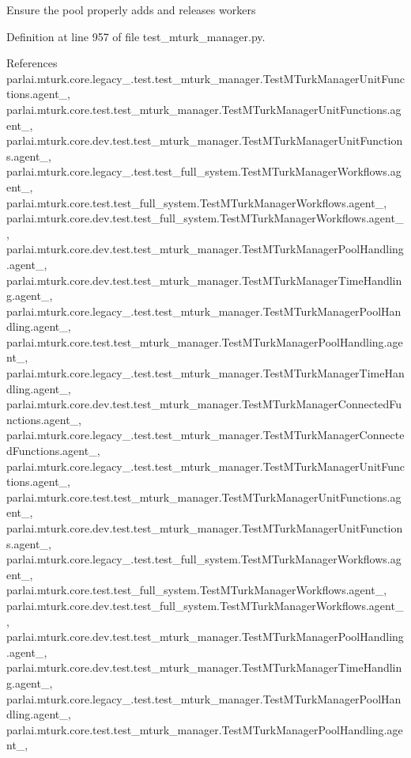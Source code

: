 \begin{DoxyVerb}Ensure the pool properly adds and releases workers\end{DoxyVerb}
 

Definition at line 957 of file test\+\_\+mturk\+\_\+manager.\+py.



References parlai.\+mturk.\+core.\+legacy\+\_.\+test.\+test\+\_\+mturk\+\_\+manager.\+Test\+M\+Turk\+Manager\+Unit\+Functions.\+agent\+\_, parlai.\+mturk.\+core.\+test.\+test\+\_\+mturk\+\_\+manager.\+Test\+M\+Turk\+Manager\+Unit\+Functions.\+agent\+\_, parlai.\+mturk.\+core.\+dev.\+test.\+test\+\_\+mturk\+\_\+manager.\+Test\+M\+Turk\+Manager\+Unit\+Functions.\+agent\+\_, parlai.\+mturk.\+core.\+legacy\+\_.\+test.\+test\+\_\+full\+\_\+system.\+Test\+M\+Turk\+Manager\+Workflows.\+agent\+\_, parlai.\+mturk.\+core.\+test.\+test\+\_\+full\+\_\+system.\+Test\+M\+Turk\+Manager\+Workflows.\+agent\+\_, parlai.\+mturk.\+core.\+dev.\+test.\+test\+\_\+full\+\_\+system.\+Test\+M\+Turk\+Manager\+Workflows.\+agent\+\_, parlai.\+mturk.\+core.\+dev.\+test.\+test\+\_\+mturk\+\_\+manager.\+Test\+M\+Turk\+Manager\+Pool\+Handling.\+agent\+\_, parlai.\+mturk.\+core.\+dev.\+test.\+test\+\_\+mturk\+\_\+manager.\+Test\+M\+Turk\+Manager\+Time\+Handling.\+agent\+\_, parlai.\+mturk.\+core.\+legacy\+\_.\+test.\+test\+\_\+mturk\+\_\+manager.\+Test\+M\+Turk\+Manager\+Pool\+Handling.\+agent\+\_, parlai.\+mturk.\+core.\+test.\+test\+\_\+mturk\+\_\+manager.\+Test\+M\+Turk\+Manager\+Pool\+Handling.\+agent\+\_, parlai.\+mturk.\+core.\+legacy\+\_.\+test.\+test\+\_\+mturk\+\_\+manager.\+Test\+M\+Turk\+Manager\+Time\+Handling.\+agent\+\_, parlai.\+mturk.\+core.\+dev.\+test.\+test\+\_\+mturk\+\_\+manager.\+Test\+M\+Turk\+Manager\+Connected\+Functions.\+agent\+\_, parlai.\+mturk.\+core.\+legacy\+\_.\+test.\+test\+\_\+mturk\+\_\+manager.\+Test\+M\+Turk\+Manager\+Connected\+Functions.\+agent\+\_, parlai.\+mturk.\+core.\+legacy\+\_.\+test.\+test\+\_\+mturk\+\_\+manager.\+Test\+M\+Turk\+Manager\+Unit\+Functions.\+agent\+\_, parlai.\+mturk.\+core.\+test.\+test\+\_\+mturk\+\_\+manager.\+Test\+M\+Turk\+Manager\+Unit\+Functions.\+agent\+\_, parlai.\+mturk.\+core.\+dev.\+test.\+test\+\_\+mturk\+\_\+manager.\+Test\+M\+Turk\+Manager\+Unit\+Functions.\+agent\+\_, parlai.\+mturk.\+core.\+legacy\+\_.\+test.\+test\+\_\+full\+\_\+system.\+Test\+M\+Turk\+Manager\+Workflows.\+agent\+\_, parlai.\+mturk.\+core.\+test.\+test\+\_\+full\+\_\+system.\+Test\+M\+Turk\+Manager\+Workflows.\+agent\+\_, parlai.\+mturk.\+core.\+dev.\+test.\+test\+\_\+full\+\_\+system.\+Test\+M\+Turk\+Manager\+Workflows.\+agent\+\_, parlai.\+mturk.\+core.\+dev.\+test.\+test\+\_\+mturk\+\_\+manager.\+Test\+M\+Turk\+Manager\+Pool\+Handling.\+agent\+\_, parlai.\+mturk.\+core.\+dev.\+test.\+test\+\_\+mturk\+\_\+manager.\+Test\+M\+Turk\+Manager\+Time\+Handling.\+agent\+\_, parlai.\+mturk.\+core.\+legacy\+\_.\+test.\+test\+\_\+mturk\+\_\+manager.\+Test\+M\+Turk\+Manager\+Pool\+Handling.\+agent\+\_, parlai.\+mturk.\+core.\+test.\+test\+\_\+mturk\+\_\+manager.\+Test\+M\+Turk\+Manager\+Pool\+Handling.\+agent\+\_, 